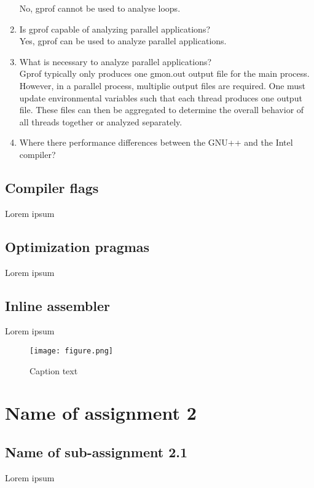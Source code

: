 \documentclass{article}
\begin{document}
\begin{enumerate}
No, gprof cannot be used to analyse loops.
\item{Is gprof capable of analyzing parallel applications?}\\
Yes, gprof can be used to analyze parallel applications.
\item{What is necessary to analyze parallel applications?}\\
Gprof typically only produces one gmon.out output file for the main process. However, in a parallel process, multiplie output files are required. One must update environmental variables such that each thread produces one output file. These files can then be aggregated to determine the overall behavior of all threads together or analyzed separately.
\item{Where there performance differences between the GNU++ and the Intel compiler?}

\end{enumerate}

\subsection{Compiler flags}
Lorem ipsum

\subsection{Optimization pragmas}
Lorem ipsum

\subsection{Inline assembler}
Lorem ipsum

\begin{figure}[h!] %
 	\begin{center}
 		\texttt{[image: figure.png]} %
 		\caption{Caption text}
 		\label{fig:figureLabelName}
 	\end{center}
\end{figure}

\section{Name of assignment 2}
\subsection{Name of sub-assignment 2.1}
Lorem ipsum
\end{document}
